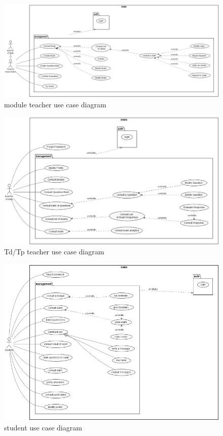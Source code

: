 \documentclass[a4paper,12p]{article}
\begin{document}
    \begin{figure}[h]
        \centering
        \includegraphics[width=450pt]{Module_Teacher}
        \caption{module teacher use case diagram}
    \end{figure}

    \begin{figure}[h]
        \centering
        \includegraphics[width=\textwidth]{TP_TD_Teacher}
        \caption{Td/Tp teacher use case diagram}
    \end{figure}

    \begin{figure}[h]
        \centering
        \includegraphics[width=350pt]{student_UCD}
        \caption{student use case diagram}
    \end{figure}
\end{document}
